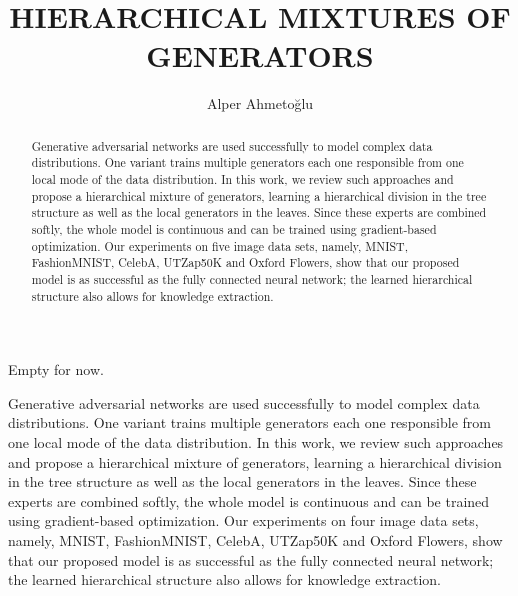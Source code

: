\documentclass[a4paper,onesided,12pt]{report}
\title{HIERARCHICAL MIXTURES OF GENERATORS}
\author{Alper Ahmetoğlu}
\begin{document}
\makemstitle %
\makeapprovalpage
\begin{acknowledgements}
Empty for now.
\end{acknowledgements}
\begin{abstract}
Generative adversarial networks are used successfully to model complex data distributions. One variant trains multiple generators each one responsible from one local mode of the data distribution. In this work, we review such approaches and propose a hierarchical mixture of generators, learning a hierarchical division in the tree structure as well as the local generators in the leaves. Since these experts are combined softly, the whole model is continuous and can be trained using gradient-based optimization. Our experiments on five image data sets, namely, MNIST, FashionMNIST, CelebA, UTZap50K and Oxford Flowers, show that our proposed model is as successful as the fully connected neural network; the learned hierarchical structure also allows for knowledge extraction.
\end{abstract}
\begin{ozet}
Generative adversarial networks are used successfully to model complex data distributions. One variant trains multiple generators each one responsible from one local mode of the data distribution. In this work, we review such approaches and propose a hierarchical mixture of generators, learning a hierarchical division in the tree structure as well as the local generators in the leaves. Since these experts are combined softly, the whole model is continuous and can be trained using gradient-based optimization. Our experiments on four image data sets, namely, MNIST, FashionMNIST, CelebA, UTZap50K and Oxford Flowers, show that our proposed model is as successful as the fully connected neural network; the learned hierarchical structure also allows for knowledge extraction.
\end{ozet}
\tableofcontents
\listoffigures
\listoftables
\begin{symbols}
%

\sym{}{}

\end{symbols}
\end{document}
